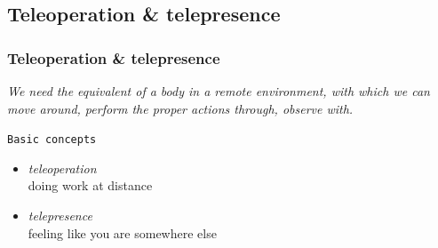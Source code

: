 \subsection{Teleoperation \& telepresence}
\frame
{
  \frametitle{Teleoperation \& telepresence}
  
  \emph{We need the equivalent of a body in a remote environment,
    with which we can move around, perform the proper actions through,
    observe with.}

  \pause

  \vskip14pt

  \begin{block} {\alert{\texttt{Basic concepts}}}

    \pause
    \begin{itemize}
      
    \item \alert{\textit{teleoperation}} \\
      doing work at distance
      \pause
      
    \item \alert{\textit{telepresence}} \\
      feeling like you are somewhere else
      
    \end{itemize}

  \end{block}
}

